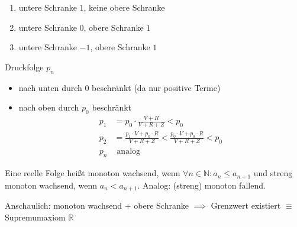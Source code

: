 \begin{example}
\begin{enumerate}
	\item untere Schranke $1$, keine obere Schranke
	\item untere Schranke $0$, obere Schranke $1$
	\item untere Schranke $-1$, obere Schranke $1$
\end{enumerate}
\end{example}

\begin{example}
Druckfolge $p_n$
\begin{itemize}
\item nach unten durch 0 beschränkt (da nur positive Terme)
\item nach oben durch $p_0$ beschränkt
\begin{align*}
p_1 &= p_0 \cdot \frac{V + R}{V + R + Z} < p_0 \\
p_2 &= \frac{p_1 \cdot V + p_0 \cdot R}{V + R + Z} < \frac{p_0 \cdot V + p_0 \cdot R}{V + R + Z} < p_0 \\
p_n &\text{ analog}
\end{align*}
\end{itemize}
\end{example}

\begin{definition}[Monotonie]
Eine reelle Folge heißt monoton wachsend, wenn $\forall n \in \mathbb N : a_n \le a_{n+1}$ und
streng monoton wachsend, wenn $a_n < a_{n+1}$. Analog: (streng) monoton fallend.
\end{definition}
Anschaulich: monoton wachsend + obere Schranke $\implies$ Grenzwert existiert $\equiv$ Supremumaxiom $\mathbb R$